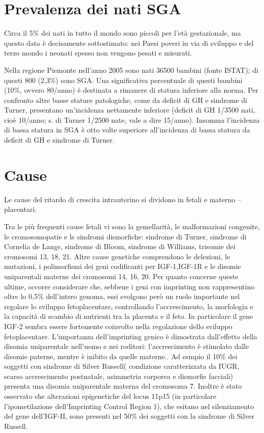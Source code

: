 \section{Prevalenza dei nati SGA}

Circa il 5\% dei nati in tutto il mondo sono piccoli per l'età gestazionale, 
ma questo dato è decisamente sottostimato: nei Paesi poveri in via di sviluppo 
e del terzo mondo i neonati spesso non vengono pesati e misurati\cite{novonordisk}.

Nella regione Piemonte nell'anno 2005 sono nati 36500 bambini (fonte ISTAT); di questi 800 (2,3\%) sono SGA. Una significativa percentuale di questi bambini (10\%, ovvero 80/anno) è destinata a rimanere di statura inferiore alla norma. Per confronto altre basse stature patologiche, come da deficit di GH e sindrome di Turner, presentano un'incidenza nettamente inferiore (deficit di GH 1/3500 nati, cioè 10/anno; s. di Turner 1/2500 nate, vale a dire 15/anno). Insomma l'incidenza di bassa statura in SGA è otto volte superiore all'incidenza di bassa statura da deficit di GH e sindrome di Turner. 


\section{Cause}

Le cause del ritardo di crescita intrauterino si dividono in
fetali e materno -- placentari.


Tra le più frequenti cause fetali vi sono la gemellarità, le malformazioni congenite, le cromosomopatie e le sindromi dismorfiche: sindrome di Turner, sindrome di Cornelia de Lange, sindrome di Bloom, sindrome di Williams, trisomie dei cromosomi 13, 18, 21.
Altre cause genetiche comprendono le delezioni, le mutazioni, i polimorfismi dei geni codificanti per IGF-1,IGF-1R %
e le disomie uniparentali materne dei cromosomi 14, 16, 20. %
Per quanto concerne queste ultime, occorre considerare che, sebbene
i geni con imprinting non rappresentino oltre lo 0,5\% dell'intero genoma, essi svolgono
però un ruolo importante nel regolare lo sviluppo fetoplacentare, controllando l'accrescimento, la 
morfologia e la capacità di scambio di nutrienti tra la placenta e il feto.
In particolare il gene IGF-2 sembra essere fortemente coinvolto nella regolazione dello sviluppo
fetoplacentare. L'importanza dell'imprinting genico è dimostrata dall'effetto della disomia uniparentale
nell'uomo e nei roditori: l'accrescimento è stimolato dalle disomie paterne, mentre \`e inibito da quelle materne.\cite{fowden2006imprinted}.
Ad esmpio il 10\% dei soggetti con sindrome di Silver Russell( condizione caratterizzata da IUGR, scarso accrescimento postnatale, asimmetria corporea e dismorfie facciali) presenta una disomia uniparentale materna del cromosoma 7. Inoltre è stato osservato che alterazioni epigenetiche del locus 11p15 (in particolare l'ipometilazione dell'Imprinting Control Region 1), che esitano nel silenziamento del gene dell'IGF-II, sono presenti nel 50\% dei soggetti con la sindrome di Silver Russell\cite{gicquel2005epimutation}.


